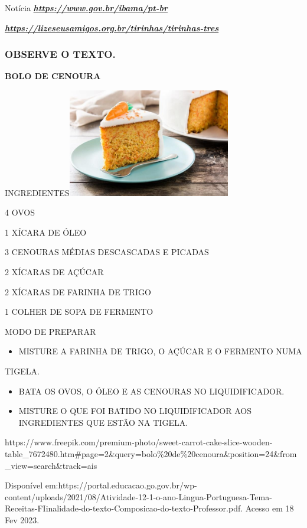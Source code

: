 Notícia
\href{https://www.gov.br/ibama/pt-br}{\textbf{\emph{https://www.gov.br/ibama/pt-br}}}

\href{https://lizeseusamigos.org.br/tirinhas/tirinhas-tres}{\textbf{\emph{https://lizeseusamigos.org.br/tirinhas/tirinhas-tres}}}

\subsubsection{OBSERVE O TEXTO. }\label{observe-o-texto.}

\textbf{BOLO DE CENOURA}

INGREDIENTES\includegraphics[width=2.79286in,height=1.86042in]{media/image153.jpg}

4 OVOS

1 XÍCARA DE ÓLEO

3 CENOURAS MÉDIAS DESCASCADAS E PICADAS

2 XÍCARAS DE AÇÚCAR

2 XÍCARAS DE FARINHA DE TRIGO

1 COLHER DE SOPA DE FERMENTO

MODO DE PREPARAR

\begin{itemize}
\item
  MISTURE A FARINHA DE TRIGO, O AÇÚCAR E O FERMENTO NUMA
\end{itemize}

TIGELA.

\begin{itemize}
\item
  BATA OS OVOS, O ÓLEO E AS CENOURAS NO LIQUIDIFICADOR.
\item
  MISTURE O QUE FOI BATIDO NO LIQUIDIFICADOR AOS INGREDIENTES QUE ESTÃO
  NA TIGELA.
\end{itemize}

https://www.freepik.com/premium-photo/sweet-carrot-cake-slice-wooden-table\_7672480.htm\#page=2\&query=bolo\%20de\%20cenoura\&position=24\&from\_view=search\&track=ais

Disponível
em:https://portal.educacao.go.gov.br/wp-content/uploads/2021/08/Atividade-12-1-o-ano-Lingua-Portuguesa-Tema-Receitas-FIinalidade-do-texto-Composicao-do-texto-Professor.pdf.
Acesso em 18 Fev 2023.

